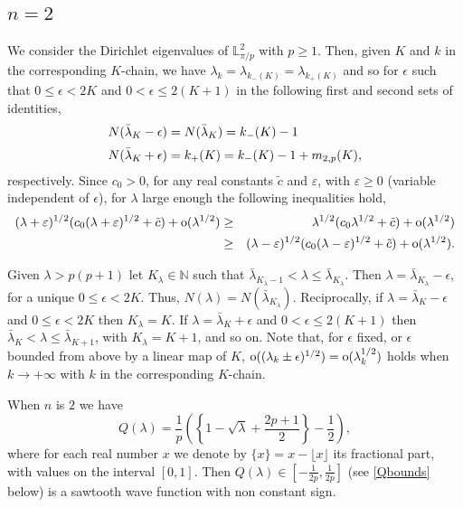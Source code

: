 \documentclass[11pt,a4paper,times]{amsart}
\theoremstyle{plain}
\theoremstyle{definition}
\numberwithin{equation}{section}
\newcommand{\eqskip}{ \vspace*{2mm}\\ }
\newcommand{\N}{\mathbb{N}}
\newcommand{\so}{{\rm o}}
\newcommand{\lune}[2]{\mathbb{L}^{#1}_{#2}}
\begin{document}
{\subsection{ $n=2$}\label{C1} We consider the Dirichlet eigenvalues of $\lune{2}{\pi/p}$ with $p\geq 1$.
Then, given $K$ and $k$ in the corresponding $K$-chain, we have  $\lambda_k=\lambda_{k_-(K)}=\lambda_{k_+(K)}$
and so for $ \epsilon$ such that $0\leq \epsilon < 2K$ and $0<\epsilon \leq 2(K+1)$ in the following first and
second sets of identities,
\begin{gather}\label{mp}
\begin{array}{l}
N(\bar{\lambda}_K-\epsilon)=N(\bar{\lambda}_K)=k_-(K)-1\eqskip
N(\bar{\lambda}_K+\epsilon)=k_+(K)=k_-(K)-1 +m_{2,p}(K),
\end{array}
\end{gather}
respectively. Since $c_0>0$, for any real constants $\tilde{c}$
and $\varepsilon$, with $\varepsilon\geq 0$ (variable independent of $\epsilon$), for  $\lambda$ large enough the following inequalities hold,
\begin{eqnarray}\nonumber
(\lambda+\varepsilon)^{1/2}( c_0(\lambda+\varepsilon)^{1/2} +\tilde{c})+ \so(\lambda^{1/2})&\geq& 
\lambda^{1/2}( c_0\lambda^{1/2} +\tilde{c})+ \so(\lambda^{1/2})\eqskip
&\geq&(\lambda-\varepsilon)^{1/2}( c_0(\lambda-\varepsilon)^{1/2} +\tilde{c})+  \so(\lambda^{1/2}).
\label{trivial2}
\end{eqnarray}

Given $\lambda>p(p+1)$ let $K_{\lambda}\in \N$ such that
$\bar{\lambda}_{K_{\lambda}-1}<\lambda \leq \bar{\lambda}_{K_{\lambda}}$.  Then $\lambda=\bar{\lambda}_{K_{\lambda}}-\epsilon$, for a unique $0\leq \epsilon <2K$. Thus,  $N(\lambda)=N(\bar{\lambda}_{K_{\lambda}})$. 
Reciprocally, if $\lambda=\bar{\lambda}_K-\epsilon$ and $0\leq \epsilon< 2K$ then $K_{\lambda}=K$. If  
 $\lambda=\bar{\lambda}_K+\epsilon$ and $0<\epsilon\leq 2(K+1)$ then $\bar{\lambda}_K<\lambda\leq \bar{\lambda}_{K+1}$, with $K_{\lambda}=K+1$, and so on.
Note that, for $\epsilon$ fixed, or $\epsilon$ bounded from above by a linear map of $K$,  $\so((\lambda_k\pm \epsilon)^{1/2})=\so(\lambda_k^{1/2})$ holds when $k\to +\infty$ with $k$ in the corresponding $K$-chain.

When $n$ is $2$ we have
\begin{equation}\label{Qlambda}
Q(\lambda)=
\frac{1}{p}\left(\left\{1-\sqrt{\lambda} +\frac{2p+1}{2}\right\}-\frac{1}{2}\right),
\end{equation}
where for each real number $x$ we denote by $\{x\}=x-\lfloor x\rfloor$ its fractional part, with values on the interval $[0,1]$.
Then $Q(\lambda)\in [-\frac{1}{2p},\frac{1}{2p}]$ (see \ref{Qbounds} below) is a  sawtooth wave function with non constant sign.
 
}
\end{document}
